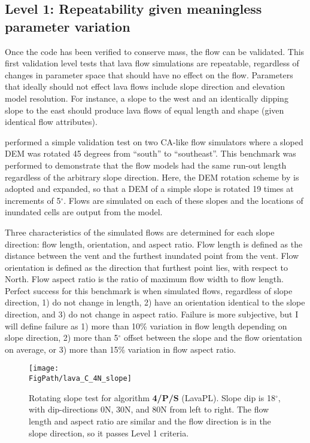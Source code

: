 	\subsection{Level 1: Repeatability given meaningless parameter variation}
		Once the code has been verified to conserve mass, the flow can be validated. This first validation level tests that lava flow simulations are repeatable, regardless of changes in parameter space that should have no effect on the flow. Parameters that ideally should not effect lava flows include slope direction and elevation model resolution. For instance, a slope to the west and an identically dipping slope to the east should produce lava flows of equal length and shape (given identical flow attributes).
		
		\citet{miyamoto1997simulating} performed a simple validation test on two CA-like flow simulators \citep{ishihara1990numerical,miyamoto1997simulating} where a sloped DEM was rotated 45 degrees from ``south'' to ``southeast''. This benchmark was performed to demonstrate that the flow models had the same run-out length regardless of the arbitrary slope direction. Here, the DEM rotation scheme by \citet{miyamoto1997simulating} is adopted and expanded, so that a DEM of a simple slope is rotated 19 times at increments of 5$^{\circ}$. Flows are simulated on each of these slopes and the locations of inundated cells are output from the model.
		
		Three characteristics of the simulated flows are determined for each slope direction: flow length, orientation, and aspect ratio. Flow length is defined as the distance between the vent and the furthest inundated point from the vent. Flow orientation is defined as the direction that furthest point lies, with respect to North. Flow aspect ratio is the ratio of maximum flow width to flow length. Perfect success for this benchmark is when simulated flows, regardless of slope direction, 1) do not change in length, 2) have an orientation identical to the slope direction, and 3) do not change in aspect ratio. Failure is more subjective, but I will define failure as 1) more than 10\% variation in flow length depending on slope direction, 2) more than 5$^{\circ}$ offset between the slope and the flow orientation on average, or 3) more than 15\% variation in flow aspect ratio.
		
		\begin{figure}[h!]
			\centering
			\texttt{[image: \\FigPath/lava\_C\_4N\_slope]}
			\caption[Rotating slope test for the LavaPL algorithm]{Rotating slope test for algorithm \textbf{4/P/S} (LavaPL). Slope dip is 18$^{\circ}$, with dip-directions 0N, 30N, and 80N from left to right. The flow length and aspect ratio are similar and the flow direction is in the slope direction, so it passes Level 1 criteria.}
			\label{fig:slope}
		\end{figure}
		

